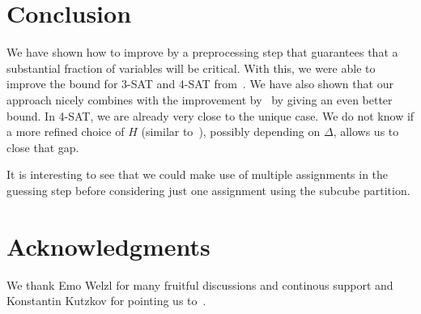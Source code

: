 \section{Conclusion}
We have shown how to improve \PPSZ{} by a preprocessing step that
guarantees that a substantial fraction of variables will be critical. With this,
we were able to improve the bound for 3-SAT and 4-SAT
from~\cite{rolf2006}. We have also shown that our approach nicely
combines with the improvement by~\cite{istt10} by giving an even
better bound. In 4-SAT, we are
already very close to the unique case. We do not know if a more
refined choice of $H$ (similar to~\cite{rolf2006}), possibly depending
on $\Delta$, allows us to close that gap.

It is interesting to see that we could make use of multiple assignments in the guessing step before considering just one assignment using the subcube partition.
\section*{Acknowledgments}
We thank Emo Welzl for many fruitful discussions and continous support and Konstantin Kutzkov for pointing us to~\cite{istt10}.
